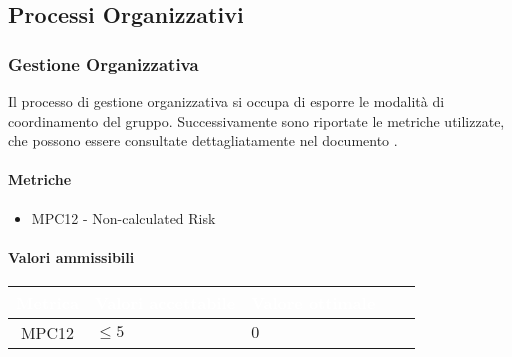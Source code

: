 \subsection{Processi Organizzativi}
\subsubsection{Gestione Organizzativa}
Il processo di gestione organizzativa si occupa di esporre le modalità di coordinamento del gruppo. Successivamente sono riportate le metriche utilizzate, che possono essere consultate dettagliatamente nel documento .
\paragraph{Metriche}
\begin{itemize}
	\item MPC12 - Non-calculated Risk 
\end{itemize}

\paragraph{Valori ammissibili}
{
\renewcommand{\arraystretch}{1.5}
\centering
\begin{longtable}{c C{2.6cm} C{3cm} C{2.6cm} C{5cm}}
\textcolor{white}{\textbf{Metrica}}&
\textcolor{white}{\textbf{Valori accettabile}}&
\textcolor{white}{\textbf{Valore ottimale}}\\	
\endhead

MPC12 & $ \leq 5 $ & $ 0 $ \\
 
\end{longtable}
}